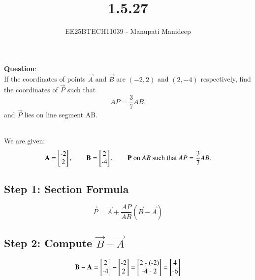 \documentclass[journal]{IEEEtran}
\begin{document}

\vspace{3cm}

\title{1.5.27}
\author{EE25BTECH11039 - Manupati Manideep}
 \maketitle
{\let\newpage\relax\maketitle}

\renewcommand{\thefigure}{\theenumi}
\renewcommand{\thetable}{\theenumi}
\setlength{\intextsep}{10pt} %


\renewcommand{\thetable}{\theenumi}

\textbf{Question}:\\
If the coordinates of points $\vec{A}$ and $\vec{B}$ are $(-2,2)$ and $(2,-4)$ respectively, find the coordinates of $\vec{P}$ such that
\[
AP = \frac{3}{7} AB.
\]
and $\vec{P}$ lies on line segment AB.


\solution\\
We are given:
\[
\vec{A} = \begin{bmatrix}$-2$ \\ $2$\end{bmatrix}, \qquad
\vec{B} = \begin{bmatrix}$2$ \\ $-4$\end{bmatrix}, \qquad
\vec{P} \text{ on } AB \text{ such that } AP = \frac{3}{7} AB.
\]

\subsection*{Step 1: Section Formula}
\[
\vec{P} = \vec{A} + \frac{AP}{AB}(\vec{B}-\vec{A})
\]

\subsection*{Step 2: Compute $\vec{B}-\vec{A}$}
\[
\vec{B}-\vec{A} =
\begin{bmatrix}$2$ \\ $-4$\end{bmatrix} -
\begin{bmatrix}$-2$ \\ $2$\end{bmatrix} =
\begin{bmatrix}
$2 - (-2)$ \\
$-4 - 2$
\end{bmatrix} =
\begin{bmatrix}
$4$ \\
$-6$
\end{bmatrix}
\]
\end{document}
